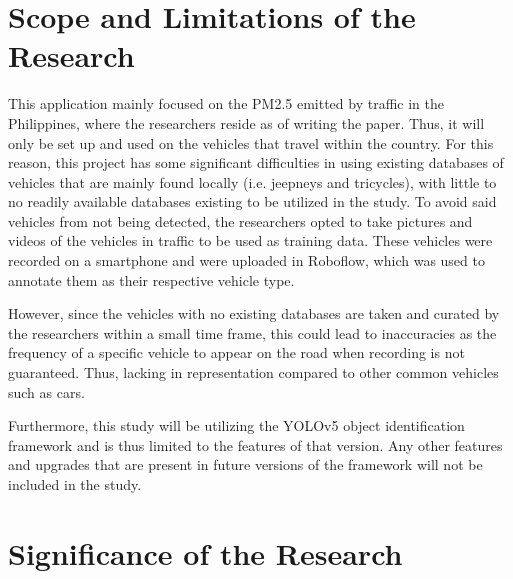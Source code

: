 \section{Scope and Limitations of the Research}
\label{sec:scopelimitations}
This application mainly focused on the PM2.5 emitted by traffic in the Philippines, where the researchers reside as of writing the paper. Thus, it will only be set up and used on the vehicles that travel within the country. For this reason, this project has some significant difficulties in using existing databases of vehicles that are mainly found locally (i.e. jeepneys and tricycles), with little to no readily available databases existing to be utilized in the study. To avoid said vehicles from not being detected, the researchers opted to take pictures and videos of the vehicles in traffic to be used as training data. These vehicles were recorded on a smartphone and were uploaded in Roboflow, which was used to annotate them as their respective vehicle type. 

However, since the vehicles with no existing databases are taken and curated by the researchers within a small time frame, this could lead to inaccuracies as the frequency of a specific vehicle to appear on the road when recording is not guaranteed. Thus, lacking in representation compared to other common vehicles such as cars.

Furthermore, this study will be utilizing the YOLOv5 object identification framework  and is thus limited to the features of that version. Any other features and upgrades that are present in future versions of the framework will not be included in the study. 



\begin{comment}

%
%
Generally, one paragraph should be allotted for each of your research objectives.

Each paragraph contains a brief overview of the concept/theory and the purpose of doing the associated objective.

Each paragraph also includes a description of the scope/limitation of your study.

* Please refer to the slides for examples.

\end{comment}


\section{Significance of the Research}
\label{sec:significance}

